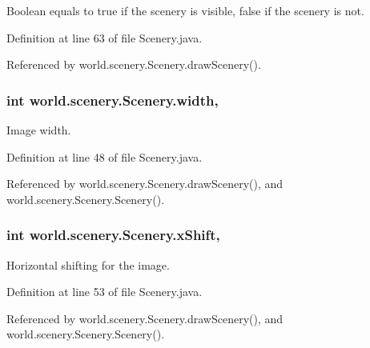 Boolean equals to true if the scenery is visible, false if the scenery is not. 



Definition at line 63 of file Scenery.\-java.



Referenced by world.\-scenery.\-Scenery.\-draw\-Scenery().

\hypertarget{a00024_ad10b27080954e2fc06aa1718f47c4ce1}{
\subsubsection[{width}]{\setlength{\rightskip}{0pt plus 5cm}int world.\-scenery.\-Scenery.\-width\hspace{0.3cm}{\ttfamily [protected]}, {\ttfamily [inherited]}}}\label{a00024_ad10b27080954e2fc06aa1718f47c4ce1}


Image width. 



Definition at line 48 of file Scenery.\-java.



Referenced by world.\-scenery.\-Scenery.\-draw\-Scenery(), and world.\-scenery.\-Scenery.\-Scenery().

\hypertarget{a00024_a0999f105f7630fd67fd9d440da6983aa}{
\subsubsection[{x\-Shift}]{\setlength{\rightskip}{0pt plus 5cm}int world.\-scenery.\-Scenery.\-x\-Shift\hspace{0.3cm}{\ttfamily [protected]}, {\ttfamily [inherited]}}}\label{a00024_a0999f105f7630fd67fd9d440da6983aa}


Horizontal shifting for the image. 



Definition at line 53 of file Scenery.\-java.



Referenced by world.\-scenery.\-Scenery.\-draw\-Scenery(), and world.\-scenery.\-Scenery.\-Scenery().

